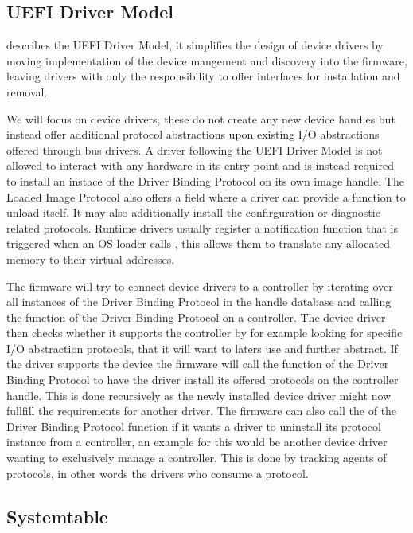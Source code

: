 \subsection{\acs{UEFI} Driver Model}

\cite[Section 2.5.2]{uefi-spec} describes the \acs{UEFI} Driver Model, it simplifies the design of device drivers by moving implementation of the device mangement and discovery into the firmware, leaving drivers with only the responsibility to offer interfaces for installation and removal.

We will focus on device drivers, these do not create any new device handles but instead offer additional protocol abstractions upon existing \ac{I/O} abstractions offered through bus drivers.
A driver following the \ac{UEFI} Driver Model is not allowed to interact with any hardware in its entry point and is instead required to install an instace of the Driver Binding Protocol on its own image handle.
The Loaded Image Protocol also offers a field where a driver can provide a function to unload itself.
It may also additionally install the confirguration or diagnostic related protocols.
Runtime drivers usually register a notification function that is triggered when an \ac{OS} loader calls , this allows them to translate any allocated memory to their virtual addresses.

The firmware will try to connect device drivers to a controller by iterating over all instances of the Driver Binding Protocol in the handle database and calling the  function of the Driver Binding Protocol on a controller. The device driver then checks whether it supports the controller by for example looking for specific \ac{I/O} abstraction protocols, that it will want to laters use and further abstract.
If the driver supports the device the firmware will call the  function of the Driver Binding Protocol to have the driver install its offered protocols on the controller handle.
This is done recursively as the newly installed device driver might now fullfill the requirements for another driver.
The firmware can also call the  of the Driver Binding Protocol function if it wants a driver to uninstall its protocol instance from a controller, an example for this would be another device driver wanting to exclusively manage a controller. This is done by tracking agents of protocols, in other words the drivers who consume a protocol.

\subsection{Systemtable}

